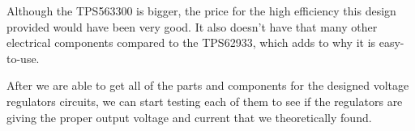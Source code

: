 Although the TPS563300 is bigger, the price for the high efficiency this design provided would have been very good. It also doesn’t have that many other electrical components compared to the TPS62933, which adds to why it is easy-to-use.\par
After we are able to get all of the parts and components for the designed voltage regulators circuits, we can start testing each of them to see if the regulators are giving the proper output voltage and current that we theoretically found.\par
